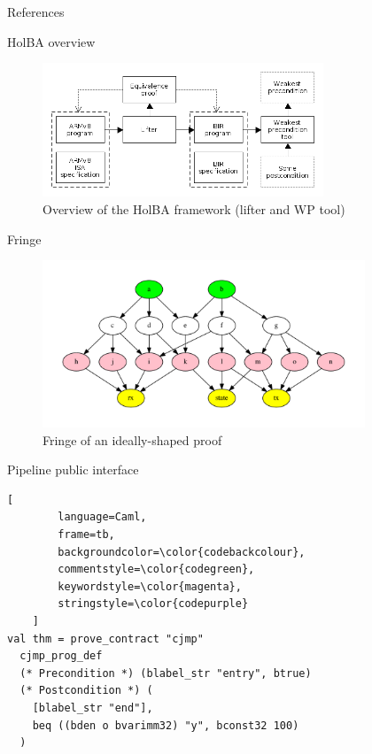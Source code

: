 \documentclass[xcolor={x11names}]{beamer}
\begin{document}

\appendix

\begin{frame}[allowframebreaks]{References}
    \nocite{*}
    
    
\end{frame}

\begin{frame}{HolBA overview}
    \begin{figure}
        \centering
        \includegraphics[height=4cm]{../figures/holba-overview.png}
        \caption{Overview of the HolBA framework (lifter and WP tool)}
    \end{figure}
\end{frame}

\begin{frame}{Fringe}
    \begin{figure}
        \centering
        \includegraphics[height=5cm]{../figures/fringe.pdf}
        \caption{Fringe of an ideally-shaped proof}
    \end{figure}
\end{frame}

\begin{frame}[fragile]{Pipeline public interface}
    \begin{lstlisting}[
        language=Caml,
        frame=tb,
        backgroundcolor=\color{codebackcolour},
        commentstyle=\color{codegreen},
        keywordstyle=\color{magenta},
        stringstyle=\color{codepurple}
    ]
val thm = prove_contract "cjmp"
  cjmp_prog_def
  (* Precondition *) (blabel_str "entry", btrue)
  (* Postcondition *) (
    [blabel_str "end"],
    beq ((bden o bvarimm32) "y", bconst32 100)
  )
    \end{lstlisting}
\end{frame}
\end{document}
